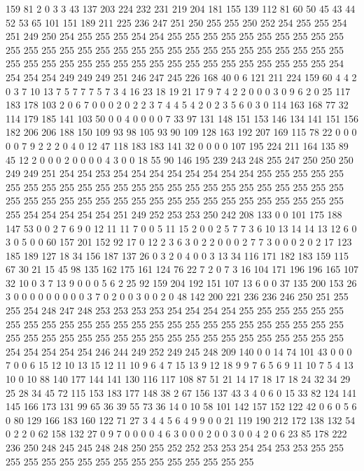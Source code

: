 159 81 2 0 3 3 43 137 203 224 232 231 219 204 181 155 139 112 81 60
50 45 43 44 52 53 65 101 151 189 211 225 236 247 251 250 255 255 250 252
254 255 255 254 251 249 250 254 255 255 255 254 254 255 255 255 255 255 255 255
255 255 255 255 255 255 255 255 255 255 255 255 255 255 255 255 255 255 255 255
255 255 255 255 255 255 255 255 255 255 255 255 255 255 255 255 255 255 255 255
254 254 254 254 249 249 249 251 246 247 245 226 168 40 0 6 121 211 224 159
60 4 4 2 0 3 7 10 13 7 5 7 7 7 5 7 3 4 16 23
18 19 21 17 9 7 4 2 2 0 0 0 3 0 9 6 2 0 25 117
183 178 103 2 0 6 7 0 0 0 2 0 2 2 3 7 4 4 5 4
2 0 2 3 5 6 0 3 0 114 163 168 77 32 114 179 185 141 103 50
0 0 4 0 0 0 0 7 33 97 131 148 151 153 146 134 141 151 156 182
206 206 188 150 109 93 98 105 93 90 109 128 163 192 207 169 115 78 22 0
0 0 0 0 7 9 2 2 2 0 4 0 12 47 118 183 183 141 32 0
0 0 0 107 195 224 211 164 135 89 45 12 2 0 0 0 2 0 0 0
0 4 3 0 0 18 55 90 146 195 239 243 248 255 247 250 250 250 249 249
251 254 254 253 254 254 254 254 254 254 254 254 255 255 255 255 255 255 255 255
255 255 255 255 255 255 255 255 255 255 255 255 255 255 255 255 255 255 255 255
255 255 255 255 255 255 255 255 255 255 255 255 255 255 255 255 254 254 254 254
254 251 249 252 253 253 250 242 208 133 0 0 101 175 188 147 53 0 0 2
7 6 9 0 12 11 11 7 0 0 5 11 15 2 0 0 2 5 7 7
3 6 10 13 14 14 13 12 6 0 3 0 5 0 0 60 157 201 152 92
17 0 12 2 3 6 3 0 2 2 0 0 0 2 7 7 3 0 0 0
2 0 2 17 123 185 189 127 18 34 156 187 137 26 0 3 2 0 4 0
0 3 13 34 116 171 182 183 159 115 67 30 21 15 45 98 135 162 175 161
124 76 22 7 2 0 7 3 16 104 171 196 196 165 107 32 10 0 3 7
13 9 0 0 0 5 6 2 25 92 159 204 192 151 107 13 6 0 0 37
135 200 153 26 3 0 0 0 0 0 0 0 0 0 3 7 0 2 0 0
3 0 0 2 0 48 142 200 221 236 236 246 250 251 255 255 254 248 247 248
253 253 253 253 254 254 254 254 255 255 255 255 255 255 255 255 255 255 255 255
255 255 255 255 255 255 255 255 255 255 255 255 255 255 255 255 255 255 255 255
255 255 255 255 255 255 255 255 255 255 255 255 254 254 254 254 254 246 244 249
252 249 245 248 209 140 0 0 14 74 101 43 0 0 0 7 0 0 6 15
12 10 13 15 12 11 10 9 6 4 7 15 13 9 12 18 9 9 7 6
5 6 9 11 10 7 5 4 13 10 0 10 88 140 177 144 141 130 116 117
108 87 51 21 14 17 18 17 18 24 32 34 29 25 28 34 45 72 115 153
183 177 148 38 2 67 156 137 43 3 4 0 6 0 15 33 82 124 141 145
166 173 131 99 65 36 39 55 73 36 14 0 10 58 101 142 157 152 122 42
0 6 0 5 6 0 80 129 166 183 160 122 71 27 3 4 4 5 6 4
9 9 0 0 21 119 190 212 172 138 132 54 0 2 2 0 62 158 132 27
0 9 7 0 0 0 0 4 6 3 0 0 0 2 0 0 3 0 0 4
2 0 6 23 85 178 222 236 250 248 245 245 248 248 250 255 252 252 253 253
254 254 253 253 255 255 255 255 255 255 255 255 255 255 255 255 255 255 255 255
